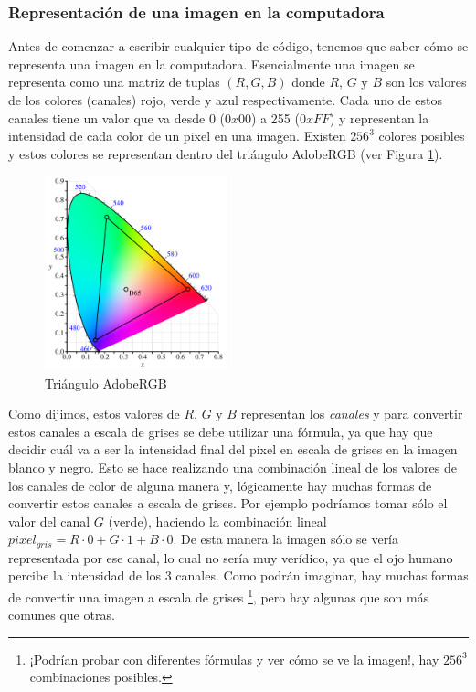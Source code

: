 \subsubsection{Representación de una imagen en la computadora}

Antes de comenzar a escribir cualquier tipo de código, tenemos que saber cómo se representa una imagen en la
computadora. Esencialmente una imagen se representa como una matriz de tuplas $(R, G, B)$ donde $R$, $G$ y $B$ son los
valores de los colores (canales) rojo, verde y azul respectivamente. Cada uno de estos canales tiene un valor que va
desde 0 ($0x00$) a 255 ($0xFF$) y representan la intensidad de cada color de un pixel en una imagen. Existen $256^3$
colores posibles y estos colores se representan dentro del triángulo AdobeRGB (ver Figura \ref{fig:adobe_rgb}).

\begin{figure}[H]
  \centering
  \includegraphics[width=200px]{./images/adobe_rgb.png}
  \caption{Triángulo AdobeRGB}
  \label{fig:adobe_rgb}
\end{figure}

Como dijimos, estos valores de $R$, $G$ y $B$ representan los \textit{canales} y para convertir estos canales a escala
de grises se debe utilizar una fórmula, ya que hay que decidir cuál va a ser la intensidad final del pixel en escala de
grises en la imagen blanco y negro. Esto se hace realizando una combinación lineal de los valores de los canales de
color de alguna manera y, lógicamente hay muchas formas de convertir estos canales a escala de grises. Por ejemplo
podríamos tomar sólo el valor del canal $G$ (verde), haciendo la combinación lineal $pixel_{gris} = R \cdot 0 + G \cdot
1 + B \cdot 0$. De esta manera la imagen sólo se vería representada por ese canal, lo cual no sería muy verídico,
ya que el ojo humano percibe la intensidad de los 3 canales. Como podrán imaginar, hay muchas formas de convertir una
imagen a escala de grises \footnote{¡Podrían probar con diferentes fórmulas y ver cómo se ve la imagen!, hay $256^3$
combinaciones posibles.}, pero hay algunas que son más comunes que otras.

